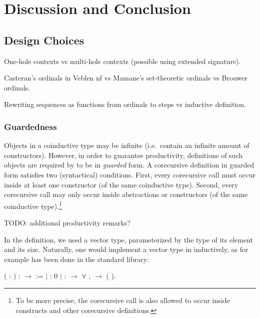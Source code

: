 \chapter{Discussion and Conclusion}\label{chap:discussion}


\section{Design Choices}

One-hole contexts vs multi-hole contexts (possible using extended signature).

Casteran's ordinals in Veblen nf vs Mamane's set-theoretic ordinals vs Brouwer
ordinals.

Rewriting sequences as functions from ordinals to steps vs inductive
definition.


\subsection{Guardedness}\label{sub:guardedness}

Objects in a coinductive type may be infinite (i.e.\ contain an infinite
amount of constructors). However, in order to guarantee productivity,
definitions of such objects are required by \Coq to be in \emph{guarded}
form. A corecursive definition in guarded form satisfies two (syntactical)
conditions. First, every corecursive call must occur inside at least one
constructor (of the same coinductive type). Second, every corecursive call may
only occur inside abstractions or constructors (of the same coinductive
type).\footnote{To be more precise, the corecursive call is also allowed to
  occur inside  constructs and other corecursive definitions.}

TODO: additional productivity remarks?

In the  definition, we used a vector
type, parameterized by the type of its element and its size. Naturally, one
would implement a vector type in \Coq inductively, as for example has been
done in the standard library:
\begin{singlespace}
\begin{coqdoccode}
\coqdocnoindent
{} 
( : ) :
\ensuremath{\rightarrow}  :=\coqdoceol
\coqdocindent{1.00em}
\ensuremath{|}   :
  0\coqdoceol
\coqdocindent{1.00em}
\ensuremath{|}  :
 \ensuremath{\rightarrow} \ensuremath{\forall} ,
 
 \ensuremath{\rightarrow}
 
(
).\coqdoceol
\end{coqdoccode}
\end{singlespace}

